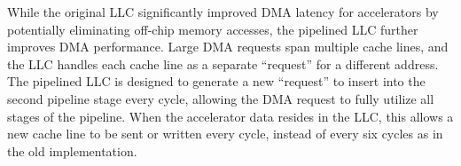 \par While the original LLC significantly improved DMA latency for accelerators
by potentially eliminating off-chip memory accesses, the pipelined LLC
further improves DMA performance. Large DMA requests span multiple
cache lines, and the LLC handles each cache line as a separate
``request'' for a different address. The pipelined LLC is designed to generate a
new ``request'' to insert into the second pipeline stage every cycle, allowing
the DMA request to fully utilize all stages of the pipeline. When the accelerator
data resides in the LLC, this allows a new cache line to be sent or written every
cycle, instead of every six cycles as in the old implementation.


